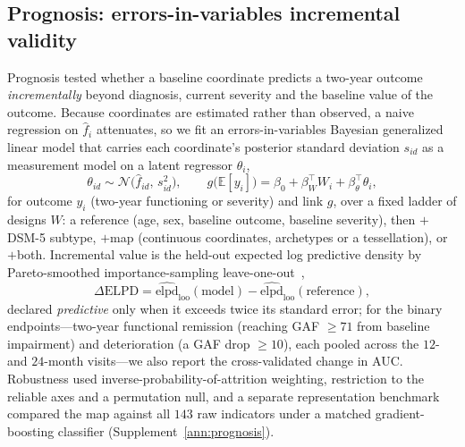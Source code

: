 \subsection{Prognosis: errors-in-variables incremental validity}

Prognosis tested whether a baseline coordinate predicts a two-year outcome \emph{incrementally}
beyond diagnosis, current severity and the baseline value of the outcome. Because coordinates
are estimated rather than observed, a naive regression on $\hat f_i$ attenuates, so we fit an
errors-in-variables Bayesian generalized linear model that carries each coordinate's posterior
standard deviation $s_{id}$ as a measurement model on a latent regressor $\theta_i$,
\begin{equation}
  \theta_{id}\sim\mathcal N\!\big(\hat f_{id},\,s_{id}^{2}\big),\qquad
  g\big(\mathbb E[y_i]\big)=\beta_0+\beta_W^{\top}W_i+\beta_\theta^{\top}\theta_i ,
  \label{eq:m-eiv}
\end{equation}
for outcome $y_i$ (two-year functioning or severity) and link $g$, over a fixed ladder of
designs $W$: a reference (age, sex, baseline outcome, baseline severity), then $+$DSM-5
subtype, $+$map (continuous coordinates, archetypes or a tessellation), or $+$both.
Incremental value is the held-out expected log predictive density by Pareto-smoothed
importance-sampling leave-one-out~\citep{vehtari2017loo},
\begin{equation}
  \Delta\mathrm{ELPD}=\widehat{\mathrm{elpd}}_{\mathrm{loo}}(\text{model})
  -\widehat{\mathrm{elpd}}_{\mathrm{loo}}(\text{reference}),
  \label{eq:m-elpd}
\end{equation}
declared \emph{predictive} only when it exceeds twice its standard error; for the binary
endpoints---two-year functional remission (reaching GAF $\ge71$ from baseline impairment) and
deterioration (a GAF drop $\ge10$), each pooled across the $12$- and $24$-month visits---we
also report the cross-validated change in AUC. Robustness used
inverse-probability-of-attrition weighting, restriction to the reliable axes and a permutation
null, and a separate representation benchmark compared the map against all $143$ raw indicators
under a matched gradient-boosting classifier (Supplement~\ref{ann:prognosis}).
